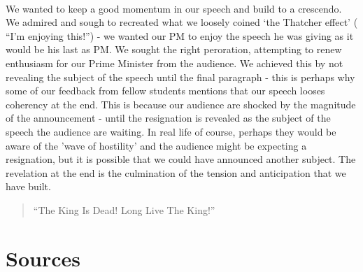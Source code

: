 \documentclass[12pt]{article}
\begin{document}
\begin{doublespace}
\paragraph{}We wanted to keep a good momentum in our speech and build to a crescendo. We admired and sough to recreated what we loosely coined `the Thatcher effect' (\cite{Thatcher:1990fk} ``I'm enjoying this!'') - we wanted our PM to enjoy the speech he was giving as it would be his last as PM. We sought the right peroration, attempting to renew enthusiasm for our Prime Minister from the audience. We achieved this by not revealing the subject of the speech until the final paragraph - this is perhaps why some of our feedback from fellow students mentions that our speech looses coherency at the end. This is because our audience are shocked by the magnitude of the announcement - until the resignation is revealed as the subject of the speech the audience are waiting. In real life of course, perhaps they would be aware of the 'wave of hostility' and the audience might be expecting a resignation, but it is possible that we could have announced another subject. The revelation at the end is the culmination of the tension and anticipation that we have built.
\begin{quote}
``The King Is Dead! Long Live The King!'' 
\end{quote}

\section{Sources}

\end{doublespace}
\end{document}
